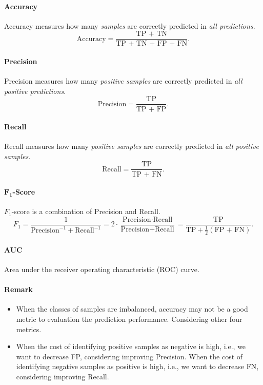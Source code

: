 \documentclass{article}
\begin{document}
\paragraph{Accuracy} Accuracy measures how many \textit{samples} are correctly predicted in \textit{all predictions}.
\begin{equation}
\text{Accuracy} = \frac{\text{TP + TN}}{\text{TP + TN + FP + FN}}.
\end{equation}
\paragraph{Precision} Precision measures how many \textit{positive samples} are correctly predicted in \textit{all positive predictions}.
\begin{equation}
    \text{Precision} = \frac{\text{TP}}{\text{TP + FP}}.
\end{equation}
\paragraph{Recall} Recall measures how many \textit{positive samples} are correctly predicted in \textit{all positive samples}.
\begin{equation}
    \text{Recall} = \frac{\text{TP}}{\text{TP + FN}}.
\end{equation}
\paragraph{$\boldsymbol{F}_\mathbf{1}$-Score} $F_1$-score is a combination of Precision and Recall.
\begin{equation}
    F_1 = \frac{1}{\text{Precision}^{-1} + \text{Recall}^{-1}} = 2 \cdot \frac{\text{Precision} \cdot \text{Recall}}{\text{Precision} + \text{Recall}} = \frac{\text{TP}}{\text{TP} + \frac{1}{2}\left(\text{FP + FN}\right)}.
\end{equation}
\paragraph{AUC} Area under the receiver operating characteristic (ROC) curve.

\paragraph{{Remark}}
\begin{itemize}
    \item When the classes of samples are imbalanced, accuracy may not be a good metric to evaluation the prediction performance. Considering other four metrics.
    \item When the cost of identifying positive samples as negative is high, i.e., we want to decrease FP, considering improving Precision. When the cost of identifying negative samples as positive is high, i.e., we want to decrease FN, considering improving Recall.
\end{itemize}
\end{document}
